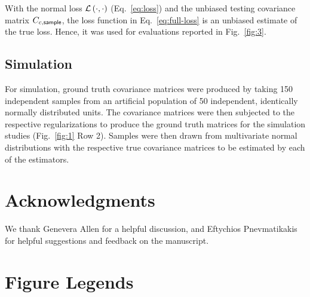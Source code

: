 With the normal loss $\mathcal L\left(\cdot,\cdot\right)$ (Eq.~\ref{eq:loss}) and the unbiased testing covariance matrix $C_{c,\sf sample}$, the loss function in Eq.~\ref{eq:full-loss} is an unbiased estimate of the true loss. Hence, it was used for evaluations reported in Fig.~\ref{fig:3}.

\subsection*{Simulation}
For simulation, ground truth covariance matrices were produced by taking 150 independent samples from an artificial population of 50 independent, identically normally distributed units. The covariance matrices were then subjected to the respective regularizations to produce the ground truth matrices for the simulation studies (Fig.~\ref{fig:1} Row 2). Samples were then drawn from multivariate normal distributions with the respective true covariance matrices to be estimated by each of the estimators.


\section*{Acknowledgments}
We thank Genevera Allen for a helpful discussion, and Eftychios Pnevmatikakis for helpful suggestions and feedback on the manuscript.  

%
%
% 


\newpage
\section*{Figure Legends}

